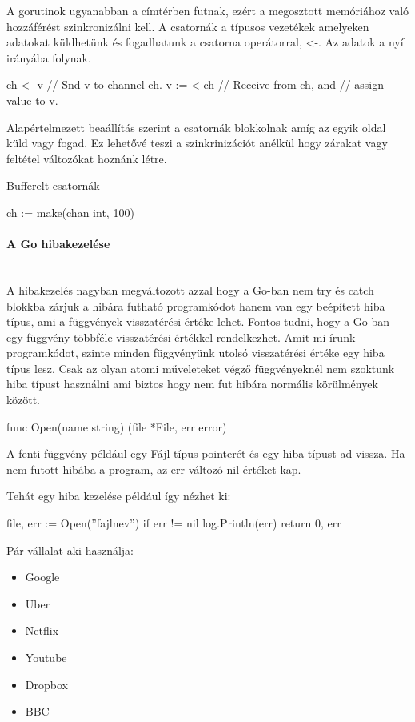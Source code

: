 A gorutinok ugyanabban a címtérben futnak, ezért a megosztott memóriához való hozzáférést szinkronizálni kell.
A csatornák a típusos vezetékek amelyeken adatokat küldhetünk és fogadhatunk a csatorna operátorral, <-.
Az adatok a nyíl irányába folynak.
\begin{python}
    ch <- v    // Snd v to channel ch.
    v := <-ch  // Receive from ch, and
    // assign value to v.
\end{python}
Alapértelmezett beaállítás szerint a csatornák blokkolnak amíg az egyik oldal küld vagy fogad.
Ez lehetővé teszi a szinkrinizációt anélkül hogy zárakat vagy feltétel változókat hoznánk létre.

Bufferelt csatornák
\begin{python}
    ch := make(chan int, 100)
\end{python}

\paragraph{A Go hibakezelése} \mbox{} \\
A hibakezelés nagyban megváltozott azzal hogy a Go-ban nem try és catch blokkba zárjuk a hibára futható programkódot
hanem van egy beépített hiba típus, ami a függvények visszatérési értéke lehet. Fontos tudni, hogy a Go-ban egy függvény többféle
visszatérési értékkel rendelkezhet. Amit mi írunk programkódot, szinte minden függvényünk utolsó visszatérési értéke egy hiba típus lesz.
Csak az olyan atomi műveleteket végző függvényeknél nem szoktunk hiba típust használni ami biztos hogy nem fut hibára normális körülmények között.
\begin{python}
    func Open(name string) (file *File, err error)
\end{python}
A fenti függvény például egy Fájl típus pointerét és egy hiba típust ad vissza. Ha nem futott hibába a program, az err változó nil értéket kap.

Tehát egy hiba kezelése például így nézhet ki:
\begin{python}
    file, err := Open(''fajlnev'')
    if err != nil {
    log.Println(err)
    return 0, err
    }
\end{python}



Pár vállalat aki használja:
\begin{itemize}
    \item Google
    \item Uber
    \item Netflix
    \item Youtube
    \item Dropbox
    \item BBC
\end{itemize}

